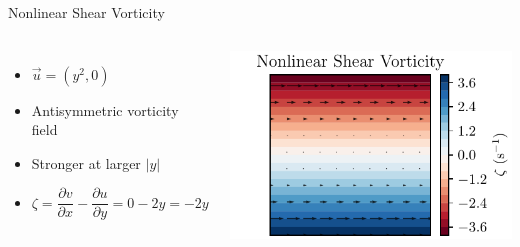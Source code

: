 \begin{frame}{Nonlinear Shear Vorticity}
	\begin{columns}
		\begin{itemize}
			\item \( \vec{u} = (y^2, 0) \)
			\item Antisymmetric vorticity field
			\item Stronger at larger \( |y| \)
			\item \( \zeta = \dfrac{\partial v}{\partial x} - \dfrac{\partial u}{\partial y} = 0-2y = -2y \)

		\end{itemize}

		\includegraphics[width=\linewidth]{../images/vorticity_plot2.pdf}
	\end{columns}
\end{frame}


